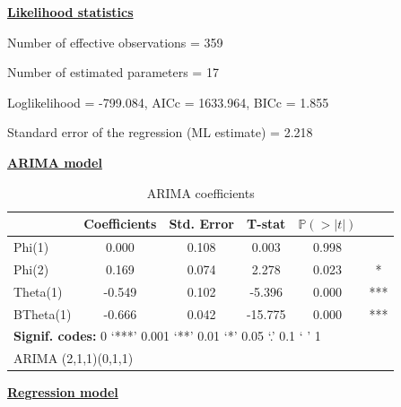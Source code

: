 \documentclass[
]{article}
\begin{document}
\underline{\textbf{Likelihood statistics}}

Number of effective observations = 359

Number of estimated parameters = 17

Loglikelihood = -799.084, AICc = 1633.964, BICc = 1.855

Standard error of the regression (ML estimate) = 2.218

\underline{\textbf{ARIMA model}}

\begin{table}[H]
\centering
\caption{\label{tab:unnamed-chunk-3}ARIMA coefficients}
\centering
\begin{tabular}[t]{lccccc}
\toprule
  & Coefficients & Std. Error & T-stat & $\mathbb P (> \lvert t \rvert)$ & \\
\midrule
Phi(1) & 0.000 & 0.108 & 0.003 & 0.998 & \\
Phi(2) & 0.169 & 0.074 & 2.278 & 0.023 & *\\
Theta(1) & -0.549 & 0.102 & -5.396 & 0.000 & ***\\
BTheta(1) & -0.666 & 0.042 & -15.775 & 0.000 & ***\\
\bottomrule
\multicolumn{6}{l}{\rule{0pt}{1em}\textbf{Signif. codes: }0 `***' 0.001 `**' 0.01 `*' 0.05 `.' 0.1 ` ' 1}\\
\multicolumn{6}{l}{\rule{0pt}{1em}ARIMA (2,1,1)(0,1,1)}\\
\end{tabular}
\end{table}

\underline{\textbf{Regression model}}
\end{document}
